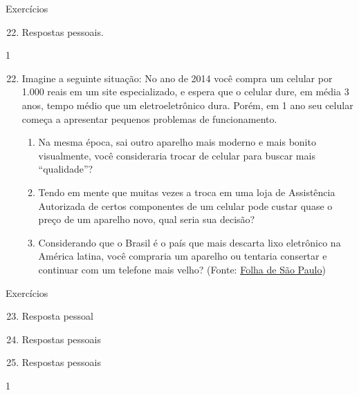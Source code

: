\begin{resposta}{Exercícios}
{
  \begin{enumerate}\setcounter{enumi}{21}
    \item Respostas pessoais.
  \end{enumerate}
}{1}
\end{resposta}
\begin{enumerate}\setcounter{enumi}{21}

\item Imagine a seguinte situação: No ano de 2014 você compra um celular por 1.000 reais em um site especializado, e espera que o celular dure, em média 3 anos, tempo médio que um eletroeletrônico dura. Porém, em 1 ano seu celular começa a apresentar pequenos problemas de funcionamento. 
  \begin{enumerate}
  \item Na mesma época, sai outro aparelho mais moderno e mais bonito visualmente, você consideraria trocar de celular para buscar mais “qualidade”?

  \item Tendo em mente que muitas vezes a troca em uma loja de Assistência Autorizada de certos componentes de um celular pode custar quase o preço de um aparelho novo, qual seria sua decisão?

  \item Considerando que o Brasil é o país que mais descarta lixo eletrônico na América latina, você compraria um aparelho ou tentaria consertar e continuar com um telefone mais velho? (Fonte: \href{http://www1.folha.uol.com.br/ambiente/2017/04/1879303-mundo-produzira-50-milhoes-de-toneladas-de-lixo-eletronico-em-2017.shtml}{Folha de São Paulo})
  \end{enumerate}
\end{enumerate}
\clearpage
\begin{resposta}{Exercícios}
{
  \begin{enumerate}\setcounter{enumi}{22}
    \item Resposta pessoal
    \item Respostas pessoais
    \item Respostas pessoais
  \end{enumerate}
}{1}
\end{resposta}
